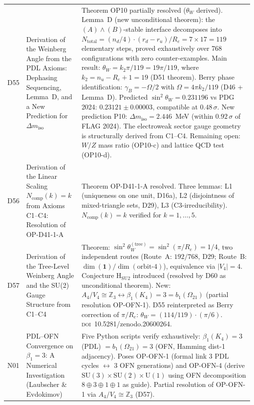 \documentclass[11pt,a4paper]{article}
\theoremstyle{plain}
\theoremstyle{definition}
\theoremstyle{remark}
\newcommand{\Kfour}{K_4}
\begin{document}
\begin{longtable}{L{1.3cm}L{3.8cm}L{8.0cm}}
D55 & Derivation of the Weinberg Angle from the PDL Axioms: Dephasing Sequencing, Lemma~D, and a New Prediction for $\Delta m_{\mathrm{iso}}$~\cite{D55} & \textcolor{proofblue}{Theorem} OP10 partially resolved ($\theta_W$ derived). Lemma~D (new unconditional theorem): the $(A)\wedge(B)$-stable interface decomposes into $N_{\mathrm{total}} = (n_d/4)\cdot(r_d-r_u)/R_e = 7\times 17 = 119$ elementary steps, proved exhaustively over 768 configurations with zero counter-examples. Main result: $\theta_W = k_2\pi/119 = 19\pi/119$, where $k_2 = n_u - R_e + 1 = 19$ (D51 theorem). Berry phase identification: $\gamma_B = -\Omega/2$ with $\Omega = 4\pi k_2/119$ (D46 + Lemma~D). Predicted $\sin^2\theta_W = 0.231196$ vs PDG 2024: $0.23121 \pm 0.00003$, compatible at $0.48\,\sigma$. New prediction P10: $\Delta m_{\mathrm{iso}} = 2.446$~MeV (within $0.92\,\sigma$ of FLAG 2024). The electroweak sector gauge geometry is structurally derived from C1--C4. Remaining open: $W/Z$ mass ratio (OP10-c) and lattice QCD test (OP10-d).\\[0.4em]
D56 & Derivation of the Linear Scaling $N_{\mathrm{comp}}(k)=k$ from Axioms C1--C4: Resolution of OP-D41-1-A~\cite{D56} & \textcolor{proofblue}{Theorem} OP-D41-1-A resolved. Three lemmas: L1 (uniqueness on one unit, D16a), L2 (disjointness of mixed-triangle sets, D29), L3 (C3-irreducibility). $N_{\mathrm{comp}}(k)=k$ verified for $k=1,\ldots,5$.\\[0.4em]
D57 & Derivation of the Tree-Level Weinberg Angle and the SU(2) Gauge Structure from C1--C4~\cite{D57} & \textcolor{proofblue}{Theorem}: $\sin^2\theta_W^{(\mathrm{tree})} = \sin^2(\pi/R_e) = 1/4$, two independent routes (Route~A: $192/768$, D29; Route~B: $\dim(\mathbf{1})/\dim(\text{orbit-4})$), equivalence via $|V_4|=4$. \textcolor{conjecturegreen}{Conjecture} H$_{\mathrm{SU2}}$ introduced (resolved by D60 as unconditional theorem). New: $A_4/V_4 \cong \mathbb{Z}_3 \leftrightarrow \beta_1(\Kfour)=3=b_1(\Omega_{21})$ (partial resolution OP-OFN-1). D55 reinterpreted as Berry correction of $\pi/R_e$: $\theta_W = (114/119)\cdot(\pi/6)$. \textsc{doi}~10.5281/zenodo.20600264.\\[0.4em]
N01 & PDL--OFN Convergence on $\beta_1=3$: A Numerical Investigation (Laubscher \& Evdokimov)~\cite{N01} & Five Python scripts verify exhaustively: $\beta_1(\Kfour)=3$ (PDL) $= b_1(\Omega_{21})=3$ (OFN, Hamming dist-1 adjacency). Poses OP-OFN-1 (formal link 3 PDL cycles $\leftrightarrow$ 3 OFN generations) and OP-OFN-4 (derive $\mathrm{SU}(3)\times\mathrm{SU}(2)\times\mathrm{U}(1)$ using OFN decomposition $8\oplus3\oplus1\oplus1$ as guide). Partial resolution of OP-OFN-1 via $A_4/V_4 \cong \mathbb{Z}_3$ (D57).\\[0.4em]

\end{longtable}
\end{document}
